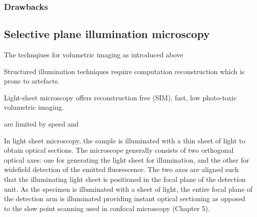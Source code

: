 \subsubsection{Drawbacks}


\subsection{Selective plane illumination microscopy}

The technqiues for volumetric imaging as introduced above

Structured illumination techniques require computation reconstruction which is prone to artefacts.

Light-sheet microscopy offers reconstruction free (SIM), fast, low photo-toxic volumetric imaging.


are limited by speed and

In light sheet microscopy, the sample is illuminated with a thin sheet of light to obtain optical sections.
The microscope generally consists of two orthogonal optical axes: one for generating the light sheet for illumination, and the other for widefield detection of the emitted fluorescence.
The two axes are aligned such that the illuminating light sheet is positioned in the focal plane of the detection unit.
As the specimen is illuminated with a sheet of light, the entire focal plane of the detection arm is illuminated providing instant optical sectioning as opposed to the slow point scanning used in confocal microscopy (Chapter 5).
